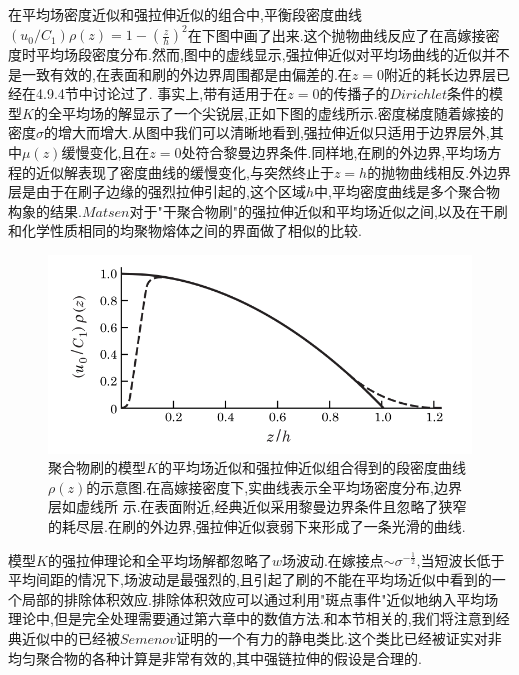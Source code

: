 在平均场密度近似和强拉伸近似的组合中,平衡段密度曲线$(u_0/C_1)\rho (z) = 1-(\frac{z}{h})^2$在下图中画了出来.这个抛物曲线反应了在高嫁接密度时平均场段密度分布.然而,图中的虚线显示,强拉伸近似对平均场曲线的近似并不是一致有效的,在表面和刷的外边界周围都是由偏差的.在$z=0$附近的耗长边界层已经在4.9.4节中讨论过了.
事实上,带有适用于在$z=0$的传播子的$Dirichlet$条件的模型$K$的全平均场的解显示了一个尖锐层,正如下图的虚线所示.密度梯度随着嫁接的密度$\sigma$的增大而增大.从图中我们可以清晰地看到,强拉伸近似只适用于边界层外,其中$\mu(z)$缓慢变化,且在$z=0$处符合黎曼边界条件.同样地,在刷的外边界,平均场方程的近似解表现了密度曲线的缓慢变化,与突然终止于$z=h$的抛物曲线相反.外边界层是由于在刷子边缘的强烈拉伸引起的,这个区域$h$中,平均密度曲线是多个聚合物构象的结果.$Matsen$对于"干聚合物刷"的强拉伸近似和平均场近似之间,以及在干刷和化学性质相同的均聚物熔体之间的界面做了相似的比较.
\begin{figure}[H]
	\centering
	\includegraphics[width=12cm]{./figures/fig5-6.png}
	\caption{聚合物刷的模型$K$的平均场近似和强拉伸近似组合得到的段密度曲线$\rho(z)$的示意图.在高嫁接密度下,实曲线表示全平均场密度分布,边界层如虚线所
		示.在表面附近,经典近似采用黎曼边界条件且忽略了狭窄的耗尽层.在刷的外边界,强拉伸近似衰弱下来形成了一条光滑的曲线.}
\end{figure}

模型$K$的强拉伸理论和全平均场解都忽略了$w$场波动.在嫁接点$\sim \sigma^{-\frac{1}{2}}$,当短波长低于平均间距的情况下,场波动是最强烈的,且引起了刷的不能在平均场近似中看到的一个局部的排除体积效应.排除体积效应可以通过利用"斑点事件"近似地纳入平均场理论中,但是完全处理需要通过第六章中的数值方法.和本节相关的,我们将注意到经典近似中的已经被$Semenov$证明的一个有力的静电类比.这个类比已经被证实对非均匀聚合物的各种计算是非常有效的,其中强链拉伸的假设是合理的.

